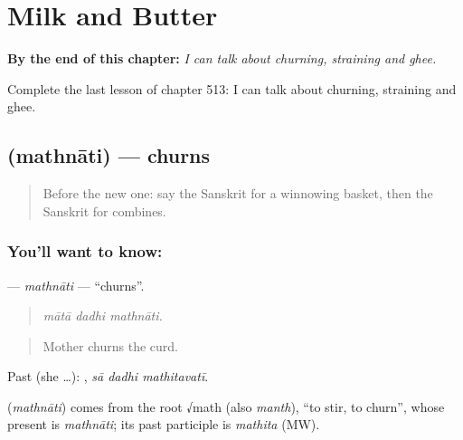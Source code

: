 
\chapter{Milk and Butter}
\label{ch:sa-milk-and-butter}

\begin{chapteropening}
\textbf{By the end of this chapter:} \emph{I can talk about churning, straining and ghee.}

Complete the last lesson of chapter 513: I can talk about churning, straining and ghee.
\end{chapteropening}

\section[\texorpdfstring{\sk{मथ्नाति} (mathnāti)}{मथ्नाति (mathnāti)}]{ (mathnāti) — churns}

\label{lesson:SA-C513-mathnati}



\begin{quote}
Before the new one: say the Sanskrit for a winnowing basket, then the Sanskrit for combines.
\end{quote}

\subsection*{You'll want to know: }
\textbf{} — \emph{mathnāti} — \textquotedblleft{}churns\textquotedblright{}.

\begin{quote}
  
\end{quote}

\begin{quote}
\emph{mātā dadhi mathnāti.}
\end{quote}

\begin{quote}
Mother churns the curd.
\end{quote}

Past (she …):   , \emph{sā dadhi mathitavatī}.

\begin{cousinweb}
\textbf{} (\emph{mathnāti}) comes from the root √math (also \emph{manth}), \textquotedblleft{}to stir, to churn\textquotedblright{}, whose present is \emph{mathnāti}; its past participle is \emph{mathita} (MW).
\end{cousinweb}

